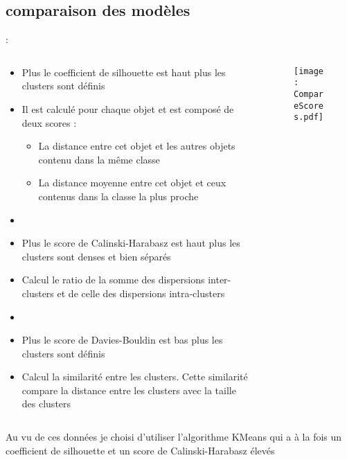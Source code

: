 \documentclass[8pt,aspectratio=169,hyperref={unicode=true}]{beamer}
\begin{document}
\subsection{comparaison des modèles}
\begin{frame}{\insertsection: \insertsubsection}
    \begin{columns}
        \begin{column}{.6\textwidth}
            \begin{itemize}
                \item Plus le coefficient de silhouette est haut plus les clusters sont définis
                \item Il est calculé pour chaque objet et est composé de deux scores :
                      \begin{itemize}
                          \item La distance entre cet objet et les autres objets contenu dans la même classe
                          \item La distance moyenne entre cet objet et ceux contenus dans la classe la plus proche
                      \end{itemize}
                \item[]
                \item Plus le score de Calinski-Harabasz est haut plus les clusters sont denses et bien séparés
                \item Calcul le ratio de la somme des dispersions inter-clusters et de celle des dispersions intra-clusters
                \item[]
                \item Plus le score de Davies-Bouldin est bas plus les clusters sont définis
                \item Calcul la similarité entre les clusters. Cette similarité compare la distance entre les clusters avec la taille des clusters
            \end{itemize}
        \end{column}
        \begin{column}{.4\textwidth}
            \begin{figure}
                \texttt{[image: CompareScores.pdf]}
            \end{figure}
        \end{column}
    \end{columns}
    \vspace{.5cm}
    Au vu de ces données je choisi d'utiliser l'algorithme KMeans qui a à la fois un coefficient de silhouette et un score de Calinski-Harabasz élevés
\end{frame}
\end{document}

